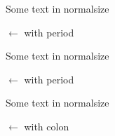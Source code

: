 \documentclass[12pt]{article}
\begin{document}

\listoffigures

\begin{figure}[!ht]
\centering Some text in normalsize
\caption[$\gets$ with period]{$\gets$ with period}
\end{figure}

\iftrue
{}

\begin{figure}[!ht]
\centering Some text in normalsize
\caption[$\gets$ with period]{$\gets$ with period}
\end{figure}


\begin{figure}[!ht]
\centering Some text in normalsize
\caption[$\gets$ without period]{$\gets$ with colon}
\end{figure}
\fi
\end{document}
